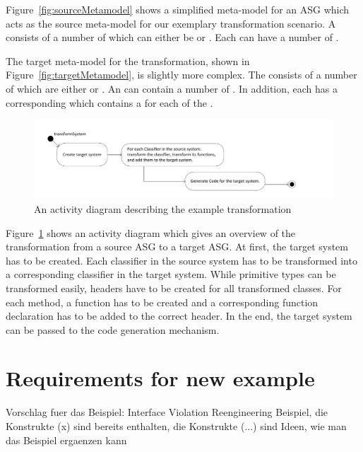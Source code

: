 Figure~\ref{fig:sourceMetamodel} shows a simplified meta-model for an ASG which acts as the source meta-model for our exemplary transformation scenario. A  consists of a number of  which can either be  or . Each  can have a number of .

The target meta-model for the transformation, shown in Figure~\ref{fig:targetMetamodel}, is slightly more complex.
The  consists of a number of  which are either  or .
An  can contain a number of . In addition, each  has a corresponding  which contains a  for each  of the .


\begin{figure}[htbp]
\begin{center}
  \includegraphics[width=\textwidth]{figures/transformationOverview}
  \caption{An activity diagram describing the example transformation}
  \label{fig:transformationOverview}
\end{center}
\end{figure}

Figure~\ref{fig:transformationOverview} shows an activity diagram which gives an overview of the transformation from a source ASG to a target ASG.
At first, the target system has to be created. Each classifier in the source system has to be transformed into a corresponding classifier in the target system. While primitive types can be transformed easily, headers have to be created for all transformed classes. For each method, a function has to be created and a corresponding function declaration has to be added to the correct header. In the end, the target system can be passed to the code generation mechanism.

\section*{Requirements for new example}

Vorschlag fuer das Beispiel: Interface Violation Reengineering Beispiel, die Konstrukte (x) sind bereits enthalten, die Konstrukte (...) sind Ideen, wie man das Beispiel ergaenzen kann

